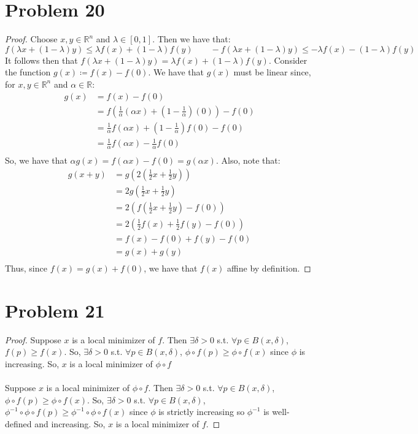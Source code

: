 \documentclass{article}
\begin{document}
\section*{Problem 20}

\begin{proof}
Choose $x, y \in \mathbb{R}^n$ and $\lambda \in [0, 1]$. Then we have that:
$$f(\lambda x + (1 - \lambda)y) \leq \lambda f(x) + (1 - \lambda) f(y) \qquad -f(\lambda x + (1 - \lambda)y) \leq -\lambda f(x) - (1 - \lambda) f(y)$$
It follows then that $f(\lambda x + (1 - \lambda)y) = \lambda f(x) + (1 - \lambda) f(y)$. Consider the function $g(x) \coloneqq f(x) - f(0)$. We have that $g(x)$ must be linear since, for $x, y \in \mathbb{R}^n$ and $\alpha \in \mathbb{R}$:
\begin{align*}
g(x) &= f(x) - f(0) \\
&= f(\frac{1}{\alpha}(\alpha x) + (1 - \frac{1}{\alpha})(0)) - f(0) \\
&= \frac{1}{\alpha}f(\alpha x) + (1 - \frac{1}{\alpha})f(0) - f(0) \\
&= \frac{1}{\alpha}f(\alpha x) - \frac{1}{\alpha}f(0) \\
\end{align*}
So, we have that $\alpha g(x) = f(\alpha x) - f(0) = g(\alpha x)$. Also, note that:
\begin{align*}
g(x + y) &= g(2(\frac{1}{2}x + \frac{1}{2}y)) \\
&= 2g(\frac{1}{2}x + \frac{1}{2}y) \\
&= 2(f(\frac{1}{2}x + \frac{1}{2}y) - f(0)) \\
&= 2(\frac{1}{2}f(x) + \frac{1}{2}f(y) - f(0)) \\
&= f(x) - f(0) + f(y) - f(0) \\
&= g(x) + g(y) \\
\end{align*}
Thus, since $f(x) = g(x) + f(0)$, we have that $f(x)$ affine by definition.
\end{proof}


\section*{Problem 21}

\begin{proof}
Suppose $x$ is a local minimizer of $f$. Then $\exists \delta > 0$ s.t. $\forall p \in B(x, \delta)$, $f(p) \geq f(x)$. So, $\exists \delta > 0$ s.t. $\forall p \in B(x, \delta)$, $\phi \circ f(p) \geq \phi \circ f(x)$ since $\phi$ is increasing. So, $x$ is a local minimizer of $\phi \circ f$ \\
\\
Suppose $x$ is a local minimizer of $\phi \circ f$. Then $\exists \delta > 0$ s.t. $\forall p \in B(x, \delta)$, $\phi \circ f(p) \geq \phi \circ f(x)$. So, $\exists \delta > 0$ s.t. $\forall p \in B(x, \delta)$, $\phi^{-1} \circ \phi \circ f(p) \geq \phi^{-1} \circ \phi \circ f(x)$ since $\phi$ is strictly increasing so $\phi^{-1}$ is well-defined and increasing. So, $x$ is a local minimizer of $f$.
\end{proof}
\end{document}
